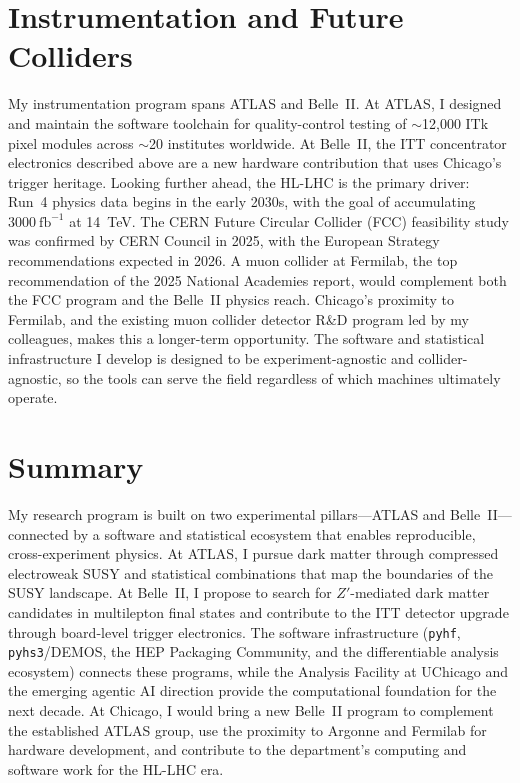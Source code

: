 \documentclass[10pt,a4paper,sans]{moderncv} %
\begin{document}
\section{Instrumentation and Future Colliders}
My instrumentation program spans ATLAS and Belle~II. At ATLAS, I designed and maintain the software toolchain for quality-control testing of $\sim$12,000 ITk pixel modules across $\sim$20 institutes worldwide. At Belle~II, the ITT concentrator electronics described above are a new hardware contribution that uses Chicago's trigger heritage. Looking further ahead, the HL-LHC is the primary driver: Run~4 physics data begins in the early 2030s, with the goal of accumulating $3000\ \mathrm{fb}^{-1}$ at 14~TeV. The CERN Future Circular Collider (FCC) feasibility study was confirmed by CERN Council in 2025, with the European Strategy recommendations expected in 2026. A muon collider at Fermilab, the top recommendation of the 2025 National Academies report, would complement both the FCC program and the Belle~II physics reach. Chicago's proximity to Fermilab, and the existing muon collider detector R\&D program led by my colleagues, makes this a longer-term opportunity. The software and statistical infrastructure I develop is designed to be experiment-agnostic and collider-agnostic, so the tools can serve the field regardless of which machines ultimately operate.

\section{Summary}
My research program is built on two experimental pillars---ATLAS and Belle~II---connected by a software and statistical ecosystem that enables reproducible, cross-experiment physics. At ATLAS, I pursue dark matter through compressed electroweak SUSY and statistical combinations that map the boundaries of the SUSY landscape. At Belle~II, I propose to search for $Z'$-mediated dark matter candidates in multilepton final states and contribute to the ITT detector upgrade through board-level trigger electronics. The software infrastructure (\texttt{pyhf}, \texttt{pyhs3}/DEMOS, the HEP Packaging Community, and the differentiable analysis ecosystem) connects these programs, while the Analysis Facility at UChicago and the emerging agentic AI direction provide the computational foundation for the next decade. At Chicago, I would bring a new Belle~II program to complement the established ATLAS group, use the proximity to Argonne and Fermilab for hardware development, and contribute to the department's computing and software work for the HL-LHC era.

\printbibliography
\end{document}
